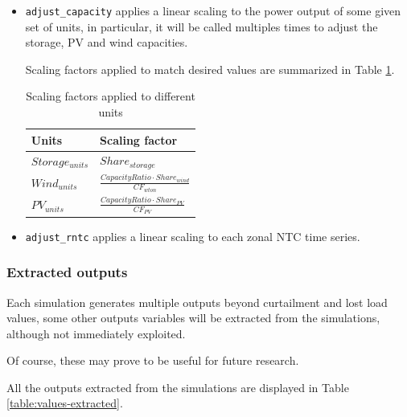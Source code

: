 \begin{itemize}
    \item \texttt{adjust\_capacity} applies a linear scaling to the power output of some given set of units, in particular, it will be called multiples times to adjust the storage, PV and wind capacities.
    
    Scaling factors applied to match desired values are summarized in Table \ref{table:scaling-factors}.

    \begin{table}[h]
        \centering
        \begin{tabular}{|l l|}
            \hline  
            Units              & Scaling factor    \\ \hline
            $Storage_{units}$  & $Share_{storage}$ \\ 
            $Wind_{units}$     & $\frac{CapacityRatio \cdot Share_{wind}}{CF_{wton}}$ \\
            $PV_{units}$       & $\frac{CapacityRatio \cdot Share_{PV}}{CF_{PV}}$ \\ \hline
        \end{tabular}
        \caption{Scaling factors applied to different units}
        \label{table:scaling-factors}
    \end{table}

    \item \texttt{adjust\_rntc} applies a linear scaling to each zonal NTC time series.
\end{itemize}

\subsubsection{Extracted outputs}

Each simulation generates multiple outputs beyond curtailment and lost load values, some other outputs variables will be extracted from the simulations, although not immediately exploited.

Of course, these may prove to be useful for future research.

All the outputs extracted from the simulations are displayed in Table \ref{table:values-extracted}.

